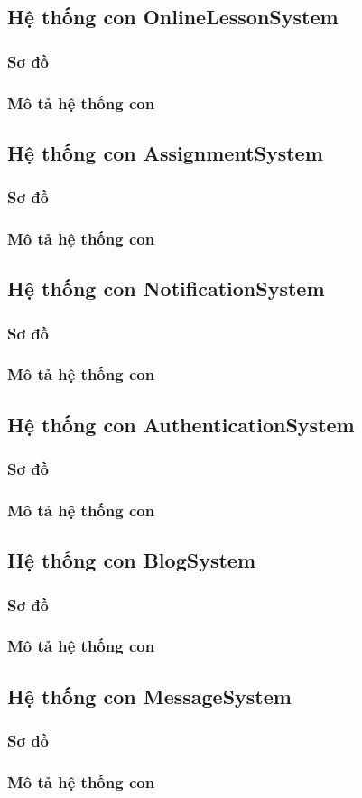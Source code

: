 \documentclass[./../main_file.tex]{subfiles}
\begin{document}
	\subsection{Hệ thống con OnlineLessonSystem}
		\subsubsection{Sơ đồ}
		\subsubsection{Mô tả hệ thống con}
	\subsection{Hệ thống con AssignmentSystem}
		\subsubsection{Sơ đồ}
		\subsubsection{Mô tả hệ thống con}
	\subsection{Hệ thống con NotificationSystem}
		\subsubsection{Sơ đồ}
		\subsubsection{Mô tả hệ thống con}
	\subsection{Hệ thống con AuthenticationSystem}
		\subsubsection{Sơ đồ}
		\subsubsection{Mô tả hệ thống con}
	\subsection{Hệ thống con BlogSystem}
		\subsubsection{Sơ đồ}
		\subsubsection{Mô tả hệ thống con}
	\subsection{Hệ thống con MessageSystem}
		\subsubsection{Sơ đồ}
		\subsubsection{Mô tả hệ thống con}
	
\end{document}
